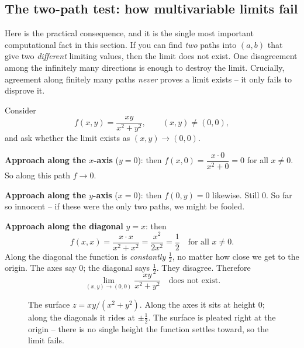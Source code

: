 \subsection*{The two-path test: how multivariable limits fail}

Here is the practical consequence, and it is the single most important computational fact in
this section. If you can find \emph{two} paths into $(a,b)$ that give two \emph{different}
limiting values, then the limit does not exist. One disagreement among the infinitely many
directions is enough to destroy the limit. Crucially, agreement along finitely many paths
\emph{never} proves a limit exists -- it only fails to disprove it.

\begin{example}
\label{ch32:ex-twopath}
Consider
\[
   f(x,y) = \frac{xy}{x^2+y^2}, \qquad (x,y)\neq(0,0),
\]
and ask whether the limit exists as $(x,y)\to(0,0)$.

\textbf{Approach along the $x$-axis} ($y=0$): then $f(x,0) = \dfrac{x\cdot 0}{x^2+0} = 0$ for
all $x\neq 0$. So along this path $f \to 0$.

\textbf{Approach along the $y$-axis} ($x=0$): then $f(0,y) = 0$ likewise. Still $0$. So far so
innocent -- if these were the only two paths, we might be fooled.

\textbf{Approach along the diagonal} $y=x$: then
\[
   f(x,x) = \frac{x\cdot x}{x^2 + x^2} = \frac{x^2}{2x^2} = \frac12
   \quad\text{for all } x\neq 0 .
\]
Along the diagonal the function is \emph{constantly} $\tfrac12$, no matter how close we get to
the origin. The axes say $0$; the diagonal says $\tfrac12$. They disagree. Therefore
\[
   \lim_{(x,y)\to(0,0)} \frac{xy}{x^2+y^2} \quad\text{does not exist.}
\]
\end{example}

\begin{figure}[H]
\centering
{}
\caption{The surface $z=xy/(x^2+y^2)$. Along the axes it sits at height $0$; along the diagonals
it rides at $\pm\tfrac12$. The surface is pleated right at the origin -- there is no single
height the function settles toward, so the limit fails.}
\label{ch32:fig-twopath}
\end{figure}

